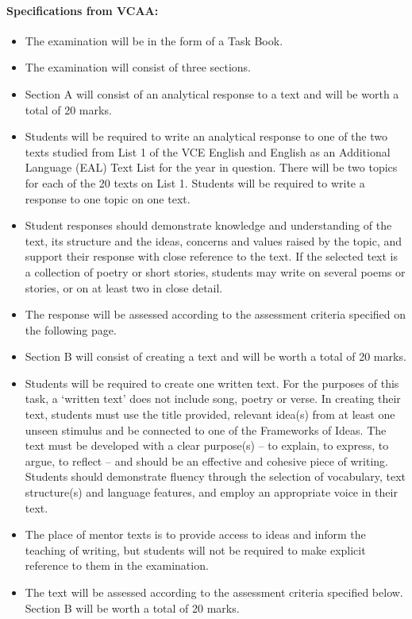 \documentclass[a4paper]{article}
\begin{document}
\paragraph{Specifications from VCAA:}
\begin{itemize}
    \item The examination will be in the form of a Task Book.
\item The examination will consist of three sections.
\item Section A will consist of an analytical response to a text and will be worth a total of 20 marks.
\item Students will be required to write an analytical response to one of the two texts studied from List 1 of the VCE English and English as an Additional Language (EAL) Text List for the year in question. There will be two topics for each of the 20 texts on List 1. Students will be required to write a response to one topic on one text.
\item Student responses should demonstrate knowledge and understanding of the text, its structure and the ideas, concerns and values raised by the topic, and support their response with close reference to the text. If the selected text is a collection of poetry or short stories, students may write on several poems or stories, or on at least two in close detail. 
\item The response will be assessed according to the assessment criteria specified on the following page.
\item Section B will consist of creating a text and will be worth a total of 20 marks. 
\item Students will be required to create one written text. For the purposes of this task, a ‘written text’ does not include song, poetry or verse. In creating their text, students must use the title provided, relevant idea(s) from at least one unseen stimulus and be connected to one of the Frameworks of Ideas. The text must be developed with a clear purpose(s) – to explain, to express, to argue, to reflect – and should be an effective and cohesive piece of writing. Students should demonstrate fluency through the selection of vocabulary, text structure(s) and language features, and employ an appropriate voice in their text. 
\item The place of mentor texts is to provide access to ideas and inform the teaching of writing, but students will not be required to make explicit reference to them in the examination.
\item The text will be assessed according to the assessment criteria specified below. Section B will be worth a total of 20 marks.

\end{itemize}
\end{document}
